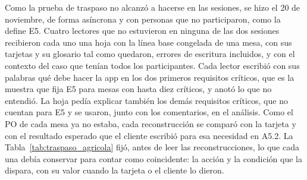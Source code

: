 \documentclass[12pt,letterpaper,oneside]{report}
\begin{document}
Como la prueba de traspaso no alcanzó a hacerse en las sesiones, se hizo el 20
de noviembre, de forma asíncrona y con personas que no participaron, como la
define E5. Cuatro lectores que no estuvieron en ninguna de las dos sesiones
recibieron cada uno una hoja con la línea base congelada de una mesa, con sus
tarjetas y su glosario tal como quedaron, errores de escritura incluidos, y con
el contexto del caso que tenían todos los participantes. Cada lector escribió
con sus palabras qué debe hacer la app en los dos primeros requisitos críticos,
que es la muestra que fija E5 para mesas con hasta diez críticos, y anotó lo que
no entendió. La hoja pedía explicar también los demás requisitos críticos, que no
cuentan para E5 y se usaron, junto con los comentarios, en el análisis. Como el
PO de cada mesa ya no estaba, cada reconstrucción se comparó con la tarjeta y con
el resultado esperado que el cliente escribió para esa necesidad en A5.2. La
Tabla~\ref{tab:traspaso_agricola} fijó, antes de leer las reconstrucciones, lo
que cada una debía conservar para contar como coincidente: la acción y la
condición que la dispara, con su valor cuando la tarjeta o el cliente lo dieron.
\end{document}
